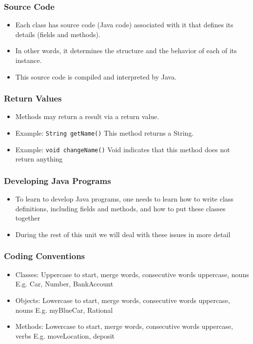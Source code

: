 \begin{frame}
\frametitle{Source Code}
\begin{itemize}
\item Each class has source code (Java code) associated with it that defines its details (fields and methods).
\item In other words, it determines the structure and the behavior of each of its instance.
\item This source code is compiled and interpreted by Java.
\end{itemize}
\end{frame}

\begin{frame}
\frametitle{Return Values}
\begin{itemize}
\item Methods may return a result via a \alert{return value}.
\item Example: \lstinline!String getName()‏!
This method returns a String.
\item Example: \lstinline!void changeName()‏!
\alert{Void} indicates that this method does not return anything
\end{itemize}
\end{frame}

\begin{frame}
\frametitle{Developing Java Programs}
\begin{itemize}
\item To learn to develop Java programs, one needs to learn how to write class definitions, including fields and methods, and how to put these classes together
\item During the rest of this unit we will deal with these issues in more detail
\end{itemize}
\end{frame}

\begin{frame}
\frametitle{Coding Conventions}
\begin{itemize}
\item Classes: Uppercase to start, merge words, consecutive words uppercase, nouns
E.g. Car, Number, BankAccount
\item Objects: Lowercase to start, merge words, consecutive words uppercase, nouns
E.g. myBlueCar, Rational
\item Methods: Lowercase to start, merge words, consecutive words uppercase, verbs
E.g. moveLocation, deposit
\end{itemize}
\end{frame}

